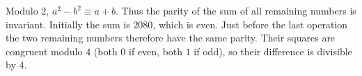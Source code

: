 Modulo $2$, $a^2-b^2\equiv a+b$. Thus the parity of the sum of all remaining numbers is invariant. Initially the sum is $2080$, which is even. Just before the last operation the two remaining numbers therefore have the same parity. Their squares are congruent modulo $4$ (both $0$ if even, both $1$ if odd), so their difference is divisible by $4$.
